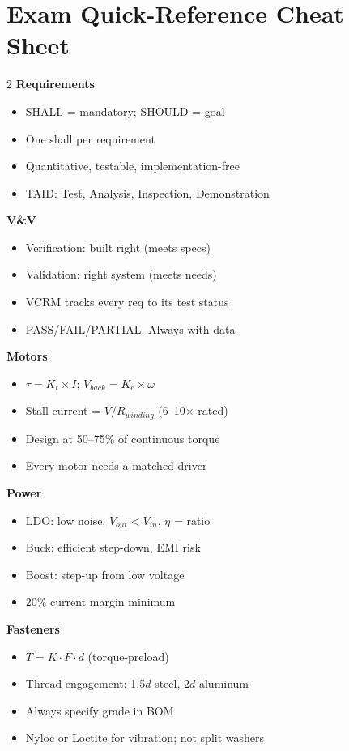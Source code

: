 \chapter*{Exam Quick-Reference Cheat Sheet}

\begin{multicols}{2}
\small
\textbf{Requirements}
\begin{itemize}[nosep,leftmargin=1em]
\item SHALL = mandatory; SHOULD = goal
\item One shall per requirement
\item Quantitative, testable, implementation-free
\item TAID: Test, Analysis, Inspection, Demonstration
\end{itemize}

\textbf{V\&V}
\begin{itemize}[nosep,leftmargin=1em]
\item Verification: built right (meets specs)
\item Validation: right system (meets needs)
\item VCRM tracks every req to its test status
\item PASS/FAIL/PARTIAL. Always with data
\end{itemize}

\textbf{Motors}
\begin{itemize}[nosep,leftmargin=1em]
\item $\tau = K_t \times I$; $V_{back} = K_e \times \omega$
\item Stall current = $V/R_{winding}$ (6--10$\times$ rated)
\item Design at 50--75\% of continuous torque
\item Every motor needs a matched driver
\end{itemize}

\textbf{Power}
\begin{itemize}[nosep,leftmargin=1em]
\item LDO: low noise, $V_{out} < V_{in}$, $\eta$ = ratio
\item Buck: efficient step-down, EMI risk
\item Boost: step-up from low voltage
\item 20\% current margin minimum
\end{itemize}

\textbf{Fasteners}
\begin{itemize}[nosep,leftmargin=1em]
\item $T = K \cdot F \cdot d$ (torque-preload)
\item Thread engagement: 1.5$d$ steel, 2$d$ aluminum
\item Always specify grade in BOM
\item Nyloc or Loctite for vibration; not split washers
\end{itemize}


\end{multicols}
